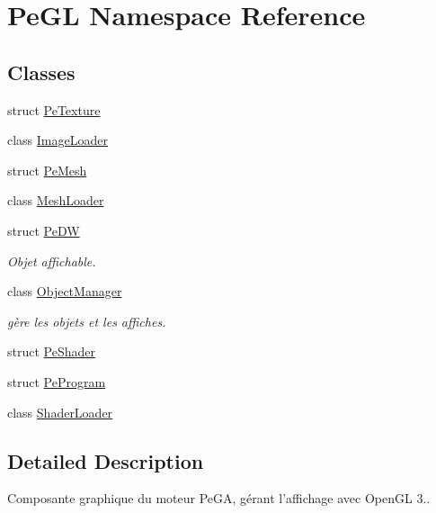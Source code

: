 \hypertarget{namespacePeGL}{\section{Pe\-G\-L Namespace Reference}
\label{namespacePeGL}
}
\subsection*{Classes}
\begin{DoxyCompactItemize}
\item 
struct \hyperlink{structPeGL_1_1PeTexture}{Pe\-Texture}
\item 
class \hyperlink{classPeGL_1_1ImageLoader}{Image\-Loader}
\item 
struct \hyperlink{structPeGL_1_1PeMesh}{Pe\-Mesh}
\item 
class \hyperlink{classPeGL_1_1MeshLoader}{Mesh\-Loader}
\item 
struct \hyperlink{structPeGL_1_1PeDW}{Pe\-D\-W}
\begin{DoxyCompactList}\small\item\em Objet affichable. \end{DoxyCompactList}\item 
class \hyperlink{classPeGL_1_1ObjectManager}{Object\-Manager}
\begin{DoxyCompactList}\small\item\em gère les objets et les affiches. \end{DoxyCompactList}\item 
struct \hyperlink{structPeGL_1_1PeShader}{Pe\-Shader}
\item 
struct \hyperlink{structPeGL_1_1PeProgram}{Pe\-Program}
\item 
class \hyperlink{classPeGL_1_1ShaderLoader}{Shader\-Loader}
\end{DoxyCompactItemize}


\subsection{Detailed Description}
Composante graphique du moteur Pe\-G\-A, gérant l'affichage avec Open\-G\-L 3.. 